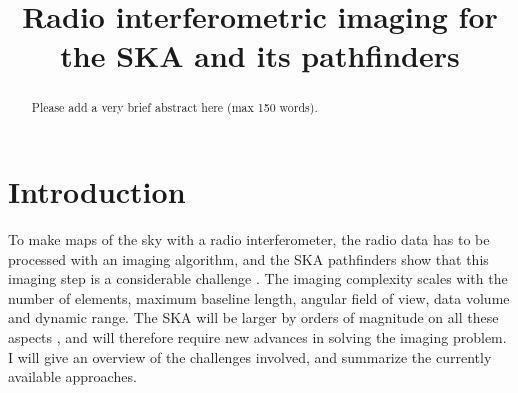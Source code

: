 \documentclass[9pt,conference,a4paper]{IEEEtran}
\begin{document}
\title{Radio interferometric imaging for the SKA and its pathfinders}

\author{%
%
%
} %

\maketitle


\begin{abstract}
Please add a very brief abstract here (max 150 words).
\end{abstract}


\section{Introduction}
To make maps of the sky with a radio interferometer, the radio data has to be processed with an imaging algorithm, and the SKA pathfinders show that this imaging step is a considerable challenge \cite{awimager-2013,offringa-wsclean-2014}. The imaging complexity scales with the number of elements, maximum baseline length, angular field of view, data volume and dynamic range. The SKA will be larger by orders of magnitude on all these aspects \cite{ska-phase1-2013}, and will therefore require new advances in solving the imaging problem. I will give an overview of the challenges involved, and summarize the currently available approaches.
\end{document}
